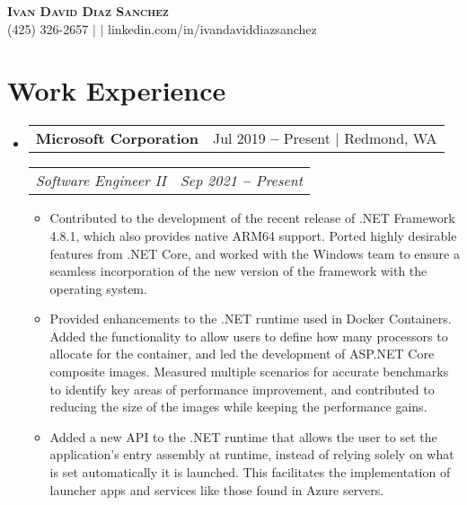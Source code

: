 \documentclass[letterpaper, 11pt]{article}
\makeatletter
\newcommand{\resumeCompanyHeading}[3]{
  \vspace{-2pt}\item
  \begin{tabular*}{0.97\textwidth}[t]{l@{\extracolsep{\fill}}r}
    \textbf{#1} & #2 $|$ #3
  \end{tabular*}
}
\newcommand{\resumePositionHeading}[2]{
  \vspace{-3pt}
  \begin{tabular*}{0.97\textwidth}[t]{l@{\extracolsep{\fill}}r}
    \textit{\small#1} & \textit{\small#2}
  \end{tabular*}\vspace{-7pt}
}
\newcommand{\resumeItem}[1]{
  \item\small{
    {#1 \vspace{-2pt}}
  }
}
\makeatother
\begin{document}
\begin{center}
  \textbf{\Huge \scshape Ivan David Diaz Sanchez} \\ \vspace{3pt}
  \small{
    \faPhone\space (425) 326-2657 $|$
    \Letter{} $|$
    \faLinkedin\space linkedin.com/in/ivandaviddiazsanchez
  }
\end{center}


\section{Work Experience}
\vspace{1pt}
\begin{itemize}[leftmargin=0.15in, label={}]


  \resumeCompanyHeading
    {Microsoft Corporation}{Jul 2019 \textbf{--} Present}{Redmond, WA}


    \resumePositionHeading
      {Software Engineer II}{Sep 2021 \textbf{--} Present}

      \begin{itemize}
        \resumeItem{Contributed to the development of the recent release of .NET Framework 4.8.1, which also provides native ARM64 support. Ported highly desirable features from .NET Core, and worked with the Windows team to ensure a seamless incorporation of the new version of the framework with the operating system.}
        \resumeItem{Provided enhancements to the .NET runtime used in Docker Containers. Added the functionality to allow users to define how many processors to allocate for the container, and led the development of ASP.NET Core composite images. Measured multiple scenarios for accurate benchmarks to identify key areas of performance improvement, and contributed to reducing the size of the images while keeping the performance gains.}
        \resumeItem{Added a new API to the .NET runtime that allows the user to set the application's entry assembly at runtime, instead of relying solely on what is set automatically it is launched. This facilitates the implementation of launcher apps and services like those found in Azure servers.}
      \end{itemize}\vspace{-5pt}


\end{itemize}
\end{document}
